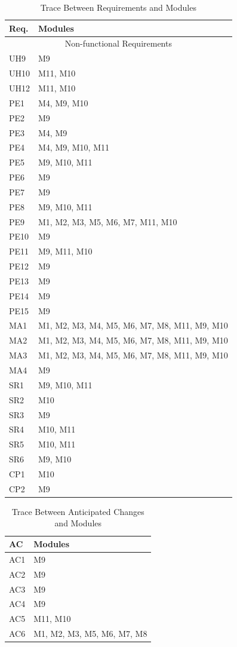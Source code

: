 \documentclass[12pt, titlepage]{article}
\begin{document}
\begin{table}[H]
\centering
\color{blue}
\begin{tabular}{p{} p{}}
\toprule
\textbf{Req.} & \textbf{Modules}\\
\midrule
\multicolumn{2}{c}{Non-functional Requirements}\\
\midrule
UH9 & M9\\
UH10 & M11, M10\\
UH12 & M11, M10\\
PE1 & M4, M9, M10\\
PE2 & M9\\
PE3 & M4, M9\\
PE4 & M4, M9, M10, M11\\
PE5 & M9, M10, M11\\
PE6 & M9\\
PE7 & M9\\
PE8 & M9, M10, M11\\
PE9 & M1, M2, M3, M5, M6, M7, M11, M10\\
PE10 & M9\\
PE11 & M9, M11, M10\\
PE12 & M9\\
PE13 & M9\\
PE14 & M9\\
PE15 & M9\\
MA1 & M1, M2, M3, M4, M5, M6, M7, M8, M11, M9, M10\\
MA2 & M1, M2, M3, M4, M5, M6, M7, M8, M11, M9, M10\\
MA3 & M1, M2, M3, M4, M5, M6, M7, M8, M11, M9,  M10\\
MA4 & M9\\
SR1 & M9, M10, M11\\
SR2 & M10\\
SR3 & M9\\
SR4 & M10, M11\\
SR5 & M10, M11\\
SR6 & M9, M10\\
CP1 & M10\\
CP2 & M9\\

\bottomrule
\end{tabular}
\color{blue}
\caption{Trace Between Requirements and Modules}
\label{TblRT}
\end{table}

\begin{table}[H]
\color{blue}
\centering
\begin{tabular}{p{} p{}}
\toprule

\textbf{AC} & \textbf{Modules}\\
\midrule
AC1 & M9\\
AC2 & M9\\
AC3 & M9\\
AC4 & M9\\
AC5 & M11, M10\\
AC6 & M1, M2, M3, M5, M6, M7, M8\\
\bottomrule
\end{tabular}
\caption{Trace Between Anticipated Changes and Modules}
\label{TblACT}
\end{table}
\end{document}
